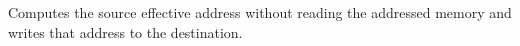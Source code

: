 Computes the source effective address without reading the addressed memory and writes that address to the destination.
